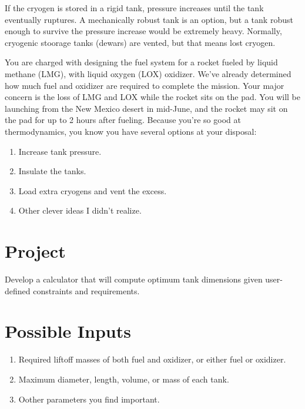\documentclass[]{tufte-book}
\providecommand{\tightlist}{%
  \setlength{\itemsep}{0pt}\setlength{\parskip}{0pt}}
\begin{document}
If the cryogen is stored in a rigid tank, pressure increases until the tank eventually ruptures. A mechanically robust tank is an option, but a tank robust enough to survive the pressure increase would be extremely heavy. Normally, cryogenic stoorage tanks (dewars) are vented, but that means lost cryogen.

You are charged with designing the fuel system for a rocket fueled by liquid methane (LMG), with liquid oxygen (LOX) oxidizer.
We've already determined how much fuel and oxidizer are required to complete the mission. Your major concern is the loss of LMG and LOX while the rocket sits on the pad. You will be launching from the New Mexico desert in mid-June, and the rocket may sit on the pad for up to 2 hours after fueling.
Because you're so good at thermodynamics, you know you have several options at your disposal:

\begin{enumerate}
\def\labelenumi{\arabic{enumi}.}
\tightlist
\item
  Increase tank pressure.
\item
  Insulate the tanks.
\item
  Load extra cryogens and vent the excess.
\item
  Other clever ideas I didn't realize.
\end{enumerate}

\hypertarget{project}{%
\section{Project}\label{project}}

Develop a calculator that will compute optimum tank dimensions given user-defined constraints and requirements.

\hypertarget{possible-inputs}{%
\section{Possible Inputs}\label{possible-inputs}}

\begin{enumerate}
\def\labelenumi{\arabic{enumi}.}
\tightlist
\item
  Required liftoff masses of both fuel and oxidizer, or either fuel or oxidizer.
\item
  Maximum diameter, length, volume, or mass of each tank.
\item
  Oother parameters you find important.
\end{enumerate}
\end{document}
